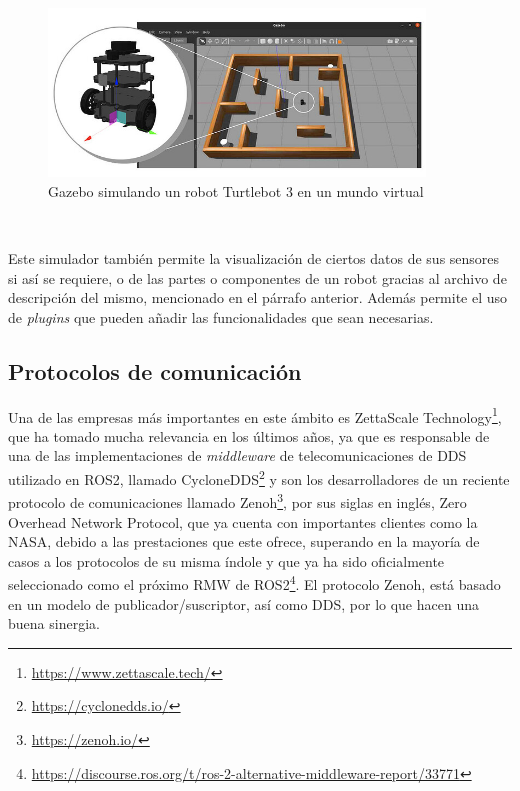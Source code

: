 \begin{figure} [h!]
  \begin{center}
    \includegraphics[width=10cm]{figs/gazebo_sim}
  \end{center}
  \caption{Gazebo simulando un robot Turtlebot 3 en un mundo virtual \cite{gazebo}}
  \label{fig:gazebo_sim}
\end{figure}\

Este simulador también permite la visualización de ciertos datos de sus sensores
si así se requiere, o de las partes o componentes de un robot gracias al archivo
de descripción del mismo, mencionado en el párrafo anterior.
Además permite el uso de \textit{plugins} que pueden añadir las funcionalidades
que sean necesarias.


\subsection{Protocolos de comunicación}
\label{sec:protocolos_comunicacion}

Una de las empresas más importantes en este ámbito es ZettaScale
Technology\footnote{\url{https://www.zettascale.tech/}}, que ha tomado mucha
relevancia en los últimos años, ya que es responsable de una de las
implementaciones de \textit{middleware} de telecomunicaciones de DDS utilizado
en ROS2, llamado CycloneDDS\footnote{\url{https://cyclonedds.io/}} y son los
desarrolladores de un reciente protocolo de comunicaciones llamado
Zenoh\footnote{\url{https://zenoh.io/}}, por sus siglas en inglés, Zero Overhead
Network Protocol, que ya cuenta con importantes clientes como la NASA, debido a
las prestaciones que este ofrece, superando en la mayoría de casos a los
protocolos de su misma índole y que ya ha sido oficialmente seleccionado como el
próximo RMW de
ROS2\footnote{\url{https://discourse.ros.org/t/ros-2-alternative-middleware-report/33771}}.
El protocolo Zenoh, está basado en un modelo de publicador/suscriptor, así como
DDS, por lo que hacen una buena sinergia.

